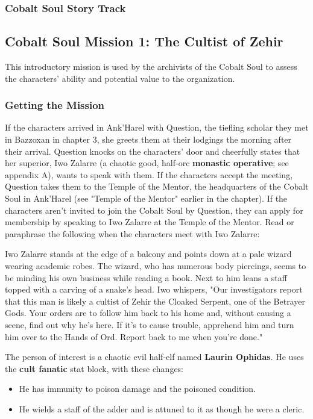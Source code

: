 \documentclass[10pt,a4,twoside,twocolumn,openany,nodeprecatedcode]{dndbook}
\begin{document}
\subsubsection{Cobalt Soul Story Track}
\subsection{Cobalt Soul Mission 1: The Cultist of Zehir}
This introductory mission is used by the archivists of the Cobalt Soul to assess the characters' ability and potential value to the organization.
\subsubsection{Getting the Mission}
If the characters arrived in Ank'Harel with Question, the tiefling scholar they met in Bazzoxan in chapter 3, she greets them at their lodgings the morning after their arrival. Question knocks on the characters' door and cheerfully states that her superior, Iwo Zalarre (a chaotic good, half-orc \textbf{monastic operative}; see appendix A), wants to speak with them. If the characters accept the meeting, Question takes them to the Temple of the Mentor, the headquarters of the Cobalt Soul in Ank'Harel (see "Temple of the Mentor" earlier in the chapter).
If the characters aren't invited to join the Cobalt Soul by Question, they can apply for membership by speaking to Iwo Zalarre at the Temple of the Mentor.
Read or paraphrase the following when the characters meet with Iwo Zalarre:
\begin{DndReadAloud}{}
Iwo Zalarre stands at the edge of a balcony and points down at a pale wizard wearing academic robes. The wizard, who has numerous body piercings, seems to be minding his own business while reading a book. Next to him leans a staff topped with a carving of a snake's head.
Iwo whispers, "Our investigators report that this man is likely a cultist of Zehir the Cloaked Serpent, one of the Betrayer Gods. Your orders are to follow him back to his home and, without causing a scene, find out why he's here. If it's to cause trouble, apprehend him and turn him over to the Hands of Ord. Report back to me when you're done."
\end{DndReadAloud}

The person of interest is a chaotic evil half-elf named \textbf{Laurin Ophidas}. He uses the \textbf{cult fanatic} stat block, with these changes:
\begin{itemize}

\item He has immunity to poison damage and the poisoned condition.
\item He wields a staff of the adder and is attuned to it as though he were a cleric.
\end{itemize}
\end{document}

